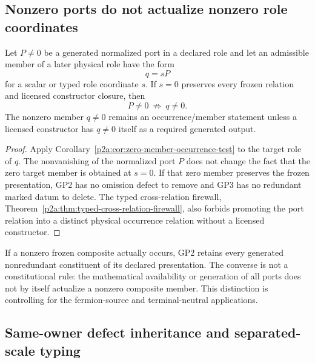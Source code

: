 \documentclass[12pt,a4paper]{article}
\begin{document}
\subsection{Nonzero ports do not actualize nonzero role coordinates}
\label{p2a:sec:v399-port-coordinate-boundary}

\begin{corollary}
\label{p2a:cor:v399-nonzero-port-zero-coordinate}
Let $P\neq0$ be a generated normalized port in a declared role and let an
admissible member of a later physical role have the form
\[
 q=sP
\]
for a scalar or typed role coordinate $s$.  If $s=0$ preserves every frozen
relation and licensed constructor closure, then
\[
 \boxed{P\neq0\ \not\Longrightarrow\ q\neq0.}
\]
The nonzero member $q\neq0$ remains an occurrence/member statement unless a
licensed constructor has $q\neq0$ itself as a required generated output.
\end{corollary}

\begin{proof}
Apply Corollary~\ref{p2a:cor:zero-member-occurrence-test} to the target role of
$q$.  The nonvanishing of the normalized port $P$ does not change the fact
that the zero target member is obtained at $s=0$.  If that zero member
preserves the frozen presentation, GP2 has no omission defect to remove and
GP3 has no redundant marked datum to delete.  The typed cross-relation
firewall, Theorem~\ref{p2a:thm:typed-cross-relation-firewall}, also forbids
promoting the port relation into a distinct physical occurrence relation
without a licensed constructor.
\end{proof}

\begin{remark}
\label{p2a:rem:v399-corealization-one-way}
If a nonzero frozen composite actually occurs, GP2 retains every generated
nonredundant constituent of its declared presentation.  The converse is not a
constitutional rule: the mathematical availability or generation of all ports
does not by itself actualize a nonzero composite member.  This distinction is
controlling for the fermion-source and terminal-neutral applications.
\end{remark}


\subsection{Same-owner defect inheritance and separated-scale typing}
\label{p2a:sec:v3100-defect-scale-typing}
\end{document}
